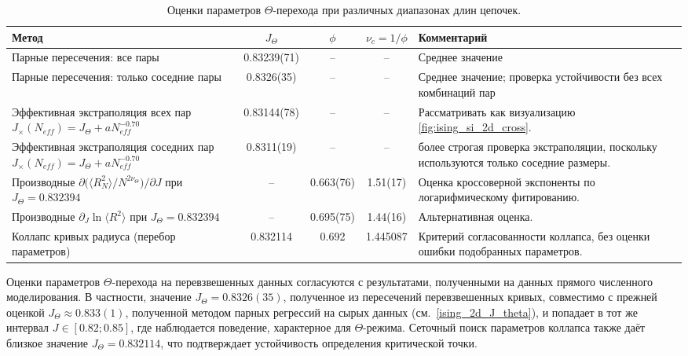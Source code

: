  \begin{table}[ht]
 	\centering
 	\small
 	\setlength{\tabcolsep}{4pt}
 	\renewcommand{\arraystretch}{1.15}
 	
 	\begin{tabularx}{\textwidth}{
 			>{\raggedright\arraybackslash}p{5.2cm}
 			c
 			c
 			c
 			>{\raggedright\arraybackslash}X
 		}
 		\toprule
 		Метод & $J_\Theta$ & $\phi$ & $\nu_c=1/\phi$ & Комментарий \\
 		\midrule
 	 
 		Парные пересечения: все пары & 0.83239(71) & -- & -- &  Среднее значение \\
 		
 		Парные пересечения: только соседние пары & 0.8326(35) & -- & -- & Среднее значение; проверка устойчивости без всех комбинаций пар \\
 		
 		Эффективная экстраполяция всех пар $J_\times(N_{  eff})=J_\Theta+aN_{  eff}^{-0.70}$ & 0.83144(78) & -- & -- &  Рассматривать как визуализацию \ref{fig:ising_si_2d_cross}.  \\
 		
 		Эффективная экстраполяция соседних пар $J_\times(N_{  eff})=J_\Theta+aN_{  eff}^{-0.70}$ & 0.8311(19) & -- & -- & более строгая проверка экстраполяции, поскольку используются только соседние размеры. \\
 		 
 		Производные
 		$\partial \bigl(\langle R_N^2\rangle / N^{2\nu_\Theta}\bigr)/\partial J$
 		при $J_\Theta=0.832394$
 		& -- & 0.663(76) & 1.51(17)  &
 		Оценка кроссоверной экспоненты по логарифмическому фитированию. \\
 		
 		Производные $\partial_J \ln\langle R^2\rangle$
 		при $J_\Theta=0.832394$
 		& -- &0.695(75) & 1.44(16)  &
 		Альтернативная оценка. \\
 		
 		Коллапс кривых радиуса (перебор параметров)
 		& 0.832114 & 0.692 & 1.445087 &
 		Критерий согласованности коллапса, без оценки ошибки подобранных параметров. \\
 		\bottomrule
 	\end{tabularx}
 	
 	\caption{Оценки параметров $\Theta$-перехода при различных диапазонах длин цепочек.}
 	\label{tab:phi_estimates}
 \end{table} 
 
Оценки параметров $\Theta$-перехода на перевзвешенных данных согласуются с результатами, полученными на данных прямого численного моделирования. 
В частности, значение $J_\Theta=0.8326(35)  $, полученное из пересечений перевзвешенных кривых,
совместимо с прежней оценкой $J_\Theta\approx 0.833(1)$, полученной методом парных регрессий на сырых данных
(см.~\eqref{ising_2d_J_theta}), и попадает в тот же интервал $J\in[0.82;0.85]$, где наблюдается поведение,
характерное для $\Theta$-режима. 
Сеточный поиск параметров коллапса также даёт близкое значение
$J_\Theta= 0.832114 $, что подтверждает устойчивость определения критической точки.

